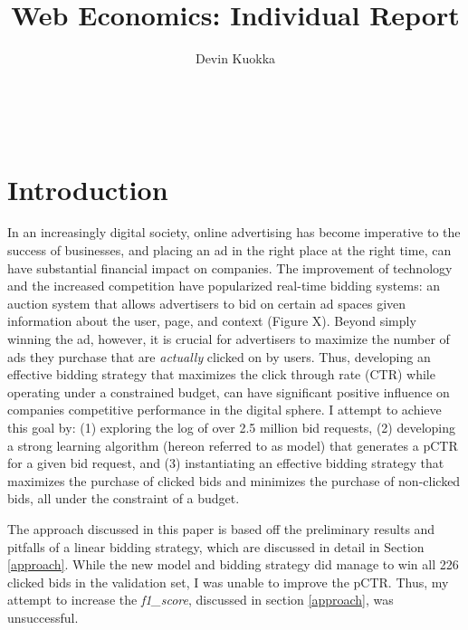 \documentclass{sig-alternate-05-2015}
\begin{document}

\title{Web Economics: Individual Report}

\author{
\alignauthor
Devin Kuokka\\
      \\
      \\
      \\
}
\maketitle

\section{Introduction}
In an increasingly digital society, online advertising has become imperative to the success of businesses, and placing an ad in the right place at the right time, can have substantial financial impact on companies.  The improvement of technology and the increased competition have popularized real-time bidding systems: an auction system that allows advertisers to bid on certain ad spaces given information about the user, page, and context (Figure X). Beyond simply winning the ad, however, it is crucial for advertisers to maximize the number of ads they purchase that are \emph{actually} clicked on by users. Thus, developing an effective bidding strategy that maximizes the click through rate (CTR) while operating under a constrained budget, can have significant positive influence on companies competitive performance in the digital sphere. I attempt to achieve this goal by: (1) exploring the log of over 2.5 million bid requests, (2) developing a strong learning algorithm (hereon referred to as model) that generates a pCTR for a given bid request, and (3) instantiating an effective bidding strategy that maximizes the purchase of clicked bids and minimizes the purchase of non-clicked bids, all under the constraint of a budget.

The approach discussed in this paper is based off the preliminary results and pitfalls of a linear bidding strategy, which are discussed in detail in Section \ref{approach}.  While the new model and bidding strategy did manage to win all 226 clicked bids in the validation set, I was unable to improve the pCTR.  Thus, my attempt to increase the \textit{f1\_score}, discussed in section \ref{approach}, was unsuccessful.
\end{document}

